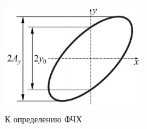 \documentclass[a4paper,12pt]{article} %
\begin{document}

\begin{figure}
	\includegraphics[width=6cm]{ellipse.jpg}
	\caption{К определению ФЧХ}
	\label{ellipse}
\end{figure}
\end{document}
